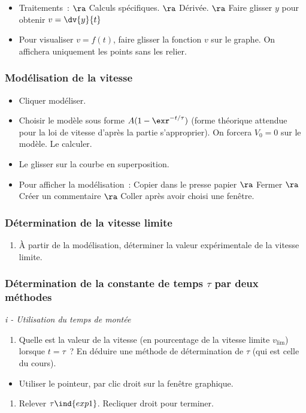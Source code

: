 \documentclass[a4paper, 11pt, final, garamond]{book}
\begin{document}
\begin{itemize}
    \item Traitements~: $\ra$ Calculs spécifiques. $\ra$ Dérivée. $\ra$ Faire
        glisser $y$ pour obtenir $v = \dv{y}{t}$
    \item Pour visualiser $v = f(t)$, faire glisser la fonction $v$ sur le
        graphe. On affichera uniquement les points sans les relier. 
\end{itemize}

\subsubsection{Modélisation de la vitesse}
\begin{itemize}
    \item Cliquer modéliser.
    \item Choisir le modèle sous forme $A(1-\exr^{-t/\tau})$ (forme théorique
        attendue pour la loi de vitesse d'après la partie s'approprier). On
        forcera $V_0 = 0$ sur le modèle. Le calculer.
    \item Le glisser sur la courbe en superposition.
    \item Pour afficher la modélisation~: Copier dans le presse papier $\ra$
        Fermer $\ra$ Créer un commentaire $\ra$ Coller après avoir choisi une
        fenêtre.
\end{itemize}

\subsubsection{Détermination de la vitesse limite}

\begin{enumerate}[label=\sqenumi, start=7]
    \item À partir de la modélisation, déterminer la valeur expérimentale de la
        vitesse limite.
\end{enumerate}

\subsubsection{Détermination de la constante de temps $\tau$ par deux méthodes}

\textit{i - Utilisation du temps de montée} \bigbreak

\begin{enumerate}[label=\sqenumi, resume]
    \item Quelle est la valeur de la vitesse (en pourcentage de la vitesse
        limite $v_{\lim}$) lorsque $t=\tau$~? En déduire une méthode de
        détermination de $\tau$ (qui est celle du cours). 
\end{enumerate}
\begin{itemize}
    \item Utiliser le pointeur, par clic droit sur la fenêtre graphique.
\end{itemize}
\begin{enumerate}[label=\sqenumi, resume]
    \item Relever $\tau\ind{exp1}$. Recliquer droit pour terminer.
\end{enumerate}
\end{document}
